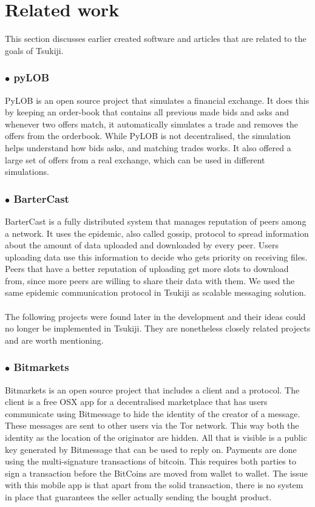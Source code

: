 \section{Related work}
This section discusses earlier created software and articles that are related to the goals of Tsukiji.

\subsubsection*{$\bullet$ pyLOB}
PyLOB \cite{pyLOB} is an open source project that simulates a financial exchange.
It does this by keeping an order-book that contains all previous made bids and asks and whenever two offers match, it automatically simulates a trade and removes the offers from the orderbook.
While PyLOB is not decentralised, the simulation helps understand how bids asks, and matching trades works.
It also offered a large set of offers from a real exchange, which can be used in different simulations.
\subsubsection*{$\bullet$ BarterCast}
BarterCast \cite{bartercast} is a fully distributed system that manages reputation of peers among a network. 
It uses the epidemic, also called gossip, protocol to spread information about the amount of data uploaded and downloaded by every peer.
Users uploading data use this information to decide who gets priority on receiving files.
Peers that have a better reputation of uploading get more slots to download from, since more peers are willing to share their data with them.
We used the same epidemic communication protocol in Tsukiji as scalable messaging solution. \\
\\
The following projects were found later in the development and their ideas could no longer be implemented in Tsukiji. 
They are nonetheless closely related projects and are worth mentioning.
\subsubsection*{$\bullet$ Bitmarkets}
Bitmarkets\cite{bitmarkets} is an open source project that includes a client and a protocol.
The client is a free OSX app for a decentralised marketplace that has users communicate using Bitmessage \cite{bitmessage} to hide the identity of the creator of a message.
These messages are sent to other users via the Tor\cite{tor} network.
This way both the identity as the location of the originator are hidden.
All that is visible is a public key generated by Bitmessage that can be used to reply on.
Payments are done using the multi-signature transactions of bitcoin.
This requires both parties to sign a transaction before the BitCoins are moved from wallet to wallet.
The issue with this mobile app is that apart from the solid transaction, there is no system in place that guarantees the seller actually sending the bought product.
